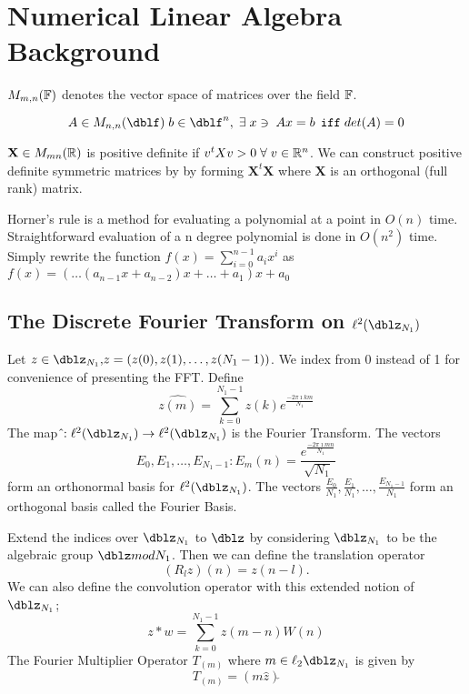 \def\baselinestretch{1}

\chapter{Numerical Linear Algebra Background}
$M_{m,n}(\mathbb{F})$ denotes the vector space of matrices over
the field $\mathbb{F}$.

\[A \in M_{n,n}(\dblf) \; b \in \dblf^n,  \exts x  \ni \; Ax=b \,
\;\texttt{iff}\; det(A)=0\]

$\mathbf{X} \in M_{mn}(\mathbb{R})$ is positive definite if $
v^{t} X v > 0 \; \forall \; v \in \mathbb{R}^n$.  We can construct
positive definite symmetric matrices by by forming
$\mathbf{X}^{t} \mathbf{X}$ where $\mathbf{X}$ is an orthogonal
(full rank) matrix.

Horner's rule is a method for evaluating a polynomial at a
point in $O(n)$ time. Straightforward evaluation of a n degree
polynomial is done in $O(n^{2})$ time. Simply rewrite the
function $f(x)= \sum\limits_{i=0}^{n-1} {a}_i x^{i}$ as
$f(x)=(\ldots (a_{n-1}x + a_{n-2} )x +  \ldots + a_1)x+a_0$

\section{The Discrete Fourier Transform on $\ell^2(\dblz_{N_1})$} Let $z \in \dblz_{N_1} ,\!
z=(z(0),z(1),\ldots,z(N_1-1))$.  We index from 0 instead of 1
for convenience of presenting the FFT. Define
\begin{equation*}
\widehat{z(m)}=\sum\limits_{k=0}^{N_1-1} z(k)e^{ \frac{-2 \pi
\imath k m}{N_1}}
\end{equation*}
The map $\hat \!: \ell^2(\dblz_{N_1}) \rightarrow
\ell^2(\dblz_{N_1})$ is the Fourier Transform. The vectors
\begin{equation*}
E_0,E_1, \ldots,E_{N_1 -1}  :\!  E_m(n)=\frac{e^\frac{-2 \pi
\imath m n}{N_1}}{\sqrt{N_1}}
\end{equation*}
form an orthonormal basis for $\ell^2(\dblz_{N_1})$. The
vectors $ \frac{E_0}{N_1},\frac{E_1}{N_1}, \ldots,\frac{E_{N_1
-1}}{N_1}$ form an orthogonal basis called the Fourier Basis.

Extend the indices over $\dblz_{N_1}$ to $\dblz$ by considering
$\dblz_{N_1}$ to be the algebraic group $\dblz mod N_1$.  Then
we can define the translation operator
\begin{equation*}
(R_l z)(n)=z(n-l).
\end{equation*}
We can also define the convolution operator with this extended
notion of $\dblz_{N_1}$;
\begin{equation*}
z * w = \sum \limits_{k=0}^{N_1-1} z(m-n)W(n)
\end{equation*}
The Fourier Multiplier Operator $T_{(m)}$ where $m \in
\ell_2{\dblz_{N_1}}$ is given by
\begin{equation*}
T_{(m)}=(m\hat z)\check{}
\end{equation*}

